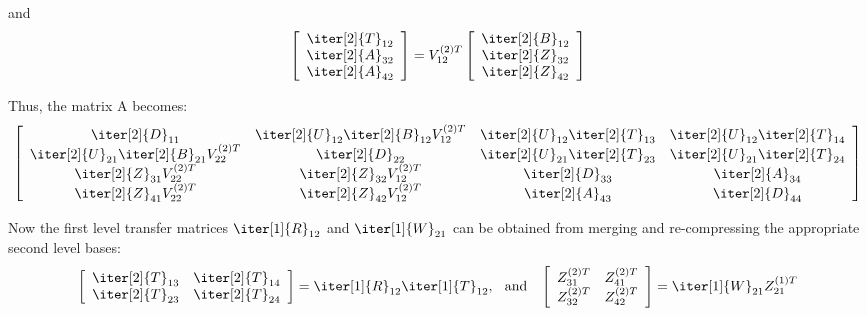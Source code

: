\noindent and
\begin{equation}
  \left[
    \begin{array}{c}
      \iter[2]{T}_{12} \\
      \iter[2]{A}_{32} \\
      \iter[2]{A}_{42} \\
    \end{array}
  \right]
  = V_{12}^{(2)T}
  \left[
    \begin{array}{ccc}
      \iter[2]{B}_{12} \\
      \iter[2]{Z}_{32} \\
      \iter[2]{Z}_{42} \\
    \end{array}
  \right]
\end{equation}

\noindent Thus, the matrix A becomes:
\begin{equation}
  \left[
    \begin{array}{cccc}
      \iter[2]{D}_{11}& \iter[2]{U}_{12}\iter[2]{B}_{12}V_{12}^{(2)T} & \iter[2]{U}_{12}\iter[2]{T}_{13}& \iter[2]{U}_{12}\iter[2]{T}_{14} \\
      \iter[2]{U}_{21}\iter[2]{B}_{21} V_{22}^{(2)T}& \iter[2]{D}_{22} & \iter[2]{U}_{21}\iter[2]{T}_{23}& \iter[2]{U}_{21}\iter[2]{T}_{24} \\
      \iter[2]{Z}_{31}V_{22}^{(2)T} & \iter[2]{Z}_{32}V_{12}^{(2)T} & \iter[2]{D}_{33}& \iter[2]{A}_{34} \\
      \iter[2]{Z}_{41}V_{22}^{(2)T} & \iter[2]{Z}_{42}V_{12}^{(2)T} & \iter[2]{A}_{43}& \iter[2]{D}_{44} \\
    \end{array}
  \right]
\end{equation}

\noindent Now the first level transfer matrices $\iter[1]{R}_{12}$ and $\iter[1]{W}_{21}$ can be obtained from merging and re-compressing the appropriate second level bases:
\begin{equation}
  \left[
    \begin{array}{cc}
      \iter[2]{T}_{13}& \iter[2]{T}_{14}  \\
      \iter[2]{T}_{23}& \iter[2]{T}_{24}  \\
    \end{array}
  \right]
  =  \iter[1]{R}_{12} \iter[1]{T}_{12}\text{,}\;\; \text{ and }\;\; 
  \left[
    \begin{array}{cc}
      Z_{31}^{(2)T}& Z_{41}^{(2)T}  \\
      Z_{32}^{(2)T}& Z_{42}^{(2)T}  \\
    \end{array}
  \right] = \iter[1]{W}_{21}Z_{21}^{(1)T} 
\end{equation}

